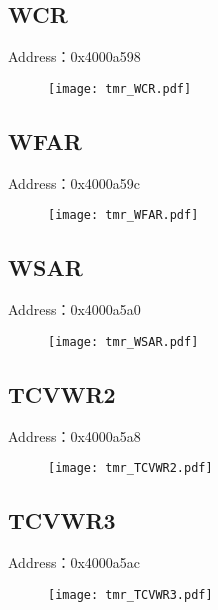\subsection{WCR}
\label{tmr-WCR}
Address：0x4000a598
 \begin{figure}[H]
\texttt{[image: tmr\_WCR.pdf]}
\end{figure}

\subsection{WFAR}
\label{tmr-WFAR}
Address：0x4000a59c
 \begin{figure}[H]
\texttt{[image: tmr\_WFAR.pdf]}
\end{figure}

\subsection{WSAR}
\label{tmr-WSAR}
Address：0x4000a5a0
 \begin{figure}[H]
\texttt{[image: tmr\_WSAR.pdf]}
\end{figure}

\subsection{TCVWR2}
\label{tmr-TCVWR2}
Address：0x4000a5a8
 \begin{figure}[H]
\texttt{[image: tmr\_TCVWR2.pdf]}
\end{figure}

\subsection{TCVWR3}
\label{tmr-TCVWR3}
Address：0x4000a5ac
 \begin{figure}[H]
\texttt{[image: tmr\_TCVWR3.pdf]}
\end{figure}

